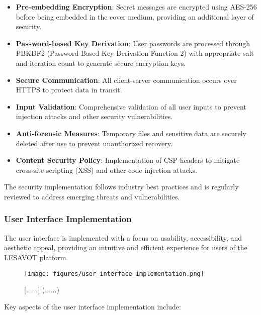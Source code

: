 \documentclass[12pt, a4paper, oneside]{book}
\begin{document}
\begin{itemize}[leftmargin=*]
    \item \textbf{Pre-embedding Encryption}: Secret messages are encrypted using AES-256 before being embedded in the cover medium, providing an additional layer of security.

    \item \textbf{Password-based Key Derivation}: User passwords are processed through PBKDF2 (Password-Based Key Derivation Function 2) with appropriate salt and iteration count to generate secure encryption keys.

    \item \textbf{Secure Communication}: All client-server communication occurs over HTTPS to protect data in transit.

    \item \textbf{Input Validation}: Comprehensive validation of all user inputs to prevent injection attacks and other security vulnerabilities.

    \item \textbf{Anti-forensic Measures}: Temporary files and sensitive data are securely deleted after use to prevent unauthorized recovery.

    \item \textbf{Content Security Policy}: Implementation of CSP headers to mitigate cross-site scripting (XSS) and other code injection attacks.
\end{itemize}

The security implementation follows industry best practices and is regularly reviewed to address emerging threats and vulnerabilities.

\subsubsection{User Interface Implementation}

The user interface is implemented with a focus on usability, accessibility, and aesthetic appeal, providing an intuitive and efficient experience for users of the LESAVOT platform.

\begin{figure}[htbp]
    \centering
    \texttt{[image: figures/user\_interface\_implementation.png]}
    \caption{[......] (......)}
    \label{fig:ui_implementation}
\end{figure}

Key aspects of the user interface implementation include:
\end{document}
